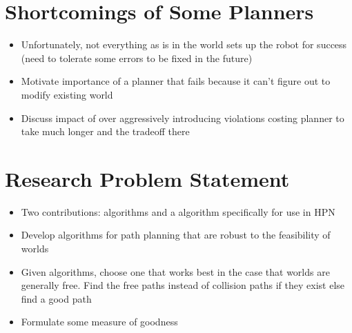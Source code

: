 \section{Shortcomings of Some Planners} \label{intro:shortcomings}

\begin{itemize}
    \item Unfortunately, not everything as is in the world sets up the robot for success (need to tolerate some errors to be fixed in the future)
    \item Motivate importance of a planner that fails because it can't figure out to modify existing world
    \item Discuss impact of over aggressively introducing violations costing planner to take much longer and the tradeoff there
\end{itemize}

\section{Research Problem Statement} \label{intro:statement}
\begin{itemize}
    \item Two contributions: algorithms and a algorithm specifically for use in HPN
    \item Develop algorithms for path planning that are robust to the feasibility of worlds
    \item Given algorithms, choose one that works best in the case that worlds are generally free. Find the free paths instead of collision paths if they exist else find a  good path
    \item Formulate some measure of goodness
\end{itemize}

